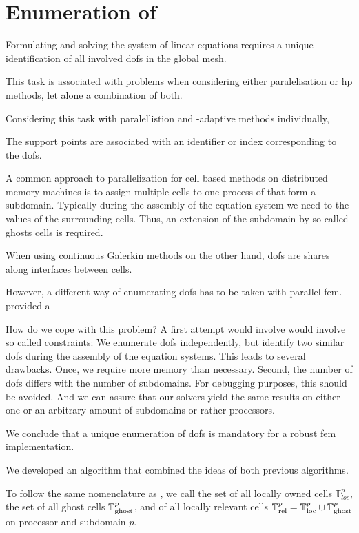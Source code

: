 \section{Enumeration of }
\label{sec:enumeration}

Formulating and solving the system of linear equations requires a unique identification of all involved \glspl{dof} in the global mesh.

This task is associated with problems when considering either paralelisation or hp methods, let alone a combination of both.

Considering this task with paralellistion and \hp-adaptive methods individually, 


The support points are associated with an identifier or index corresponding to the \glspl{dof}.



A common approach to parallelization for cell based methods on distributed memory machines is to assign multiple cells to one process of that form a subdomain. Typically during the assembly of the equation system we need to the values of the surrounding cells. Thus, an extension of the subdomain by so called ghosts cells is required.


When using continuous Galerkin methods on the other hand, \glspl{dof} are shares along interfaces between cells.


However, a different way of enumerating \glspl{dof} has to be taken with parallel \gls{fem}. \textcite{bangerth2012} provided a 


How do we cope with this problem? A first attempt would involve would involve so called constraints: We enumerate \glspl{dof} independently, but identify two similar \glspl{dof} during the assembly of the equation systems. This leads to several drawbacks. Once, we require more memory than necessary. Second, the number of \glspl{dof} differs with the number of subdomains. For debugging purposes, this should be avoided. And we can assure that our solvers yield the same results on either one or an arbitrary amount of subdomains or rather processors.

We conclude that a unique enumeration of \glspl{dof} is mandatory for a robust \gls{fem} implementation.

We developed an algorithm that combined the ideas of both previous algorithms.

To follow the same nomenclature as \cite{bangerth2012}, we call the set of all locally owned cells $\mathbb{T}^p_{loc}$, the set of all ghost cells $\mathbb{T}^p_{\text{ghost}}$, and of all locally relevant cells $\mathbb{T}^p_{\text{rel}} = \mathbb{T}^p_{\text{loc}} \cup \mathbb{T}^p_{\text{ghost}}$ on processor and subdomain $p$.

